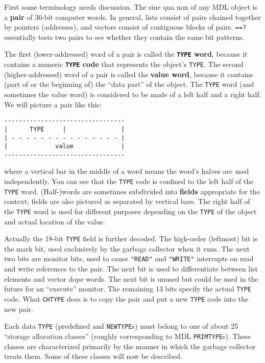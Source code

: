 \documentclass[a4paper,]{article}
\begin{document}
First some terminology needs discussion. The sine qua non of any MDL object is a \textbf{pair} of 36-bit computer words. In
general, lists consist of pairs chained together by pointers (addresses), and vectors consist of contiguous blocks of
pairs. \texttt{==?}  essentially tests two pairs to see whether they contain the same bit patterns.

The first (lower-addressed) word of a pair is called the \textbf{\texttt{TYPE} word}, because it contains a numeric
\textbf{\texttt{TYPE} code} that represents the object's \texttt{TYPE}. The second (higher-addressed)
word of a pair is called the \textbf{value word}, because it contains (part of or the beginning of) the ``data part'' of
the object. The \texttt{TYPE} word (and sometimes the value word) is considered to be made of a left
half and a right half. We will picture a pair like this:

\begin{verbatim}
---------------------------------
|      TYPE     |               |
| - - - - - - - - - - - - - - - |
|             value             |
---------------------------------
\end{verbatim}

where a vertical bar in the middle of a word means the word's halves are used independently. You can see that the
\texttt{TYPE} code is confined to the left half of the \texttt{TYPE} word. (Half-)words are sometimes subdivided into
\textbf{fields} appropriate for the context; fields are also pictured as separated by vertical bars. The right half of the
\texttt{TYPE} word is used for different purposes depending on the \texttt{TYPE} of the object and actual location of the
value.

Actually the 18-bit \texttt{TYPE} field is further decoded. The high-order (leftmost) bit is the mark bit, used exclusively
by the garbage collector when it runs. The next two bits are monitor bits, used to cause \texttt{"READ"}
 and \texttt{"WRITE"}  interrupts on read and write references to
the pair. The next bit is used to differentiate between list elements and vector dope words. The next bit is unused but
could be used in the future for an ``execute'' monitor. The remaining 13 bits specify the actual \texttt{TYPE} code. What
\texttt{CHTYPE} does is to copy the pair and put a new \texttt{TYPE} code into the new pair.

Each data \texttt{TYPE} (predefined and \texttt{NEWTYPE}s) must belong to one of about 25 ``storage allocation classes''
(roughly corresponding to MDL \texttt{PRIMTYPE}s). These classes are characterized primarily by the manner in which the
garbage collector treats them. Some of these classes will now be described.
\end{document}
